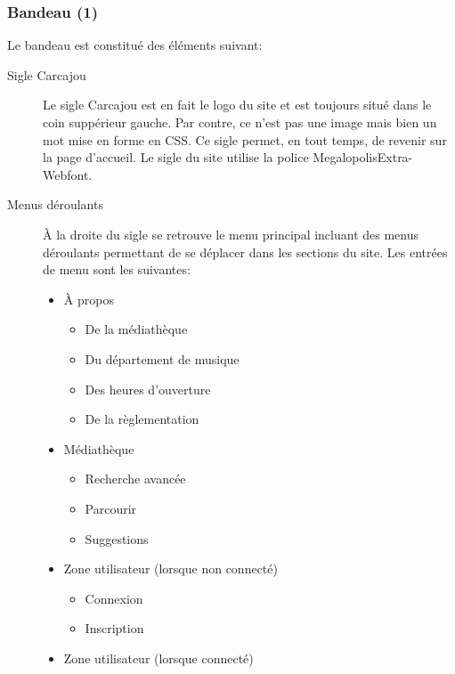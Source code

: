 \documentclass[letter, 11pt, draft]{report}
\begin{document}
\subsubsection{Bandeau (1)}

Le bandeau est constitué des éléments suivant:
\begin{description}
	\item[Sigle Carcajou] Le sigle Carcajou est en fait le logo du site et est toujours situé dans le coin suppérieur gauche. Par contre, ce n'est pas une image mais bien un mot mise en forme en CSS. Ce sigle permet, en tout temps, de revenir sur la page d'accueil. Le sigle du site utilise la police MegalopolisExtra-Webfont.
	\item[Menus déroulants]À la droite du sigle se retrouve le menu principal incluant des menus déroulants permettant de se déplacer dans les sections du site. Les entrées de menu sont les suivantes:
		\begin{itemize}
			\item À propos
				\begin{itemize}
					\item De la médiathèque
					\item Du département de musique
					\item Des heures d'ouverture
					\item De la règlementation					
				\end{itemize}
		\end{itemize}
		\begin{itemize}
			\item Médiathèque
			\begin{itemize}
				\item Recherche avancée
				\item Parcourir
				\item Suggestions				
			\end{itemize}
		\end{itemize}
		\begin{itemize}
			\item Zone utilisateur (lorsque non connecté)
			\begin{itemize}
				\item Connexion
				\item Inscription			
			\end{itemize}
		\end{itemize}
		\begin{itemize}
			\item Zone utilisateur (lorsque connecté)
			\begin{itemize}

\end{itemize}
\end{itemize}
\end{description}
\end{document}
